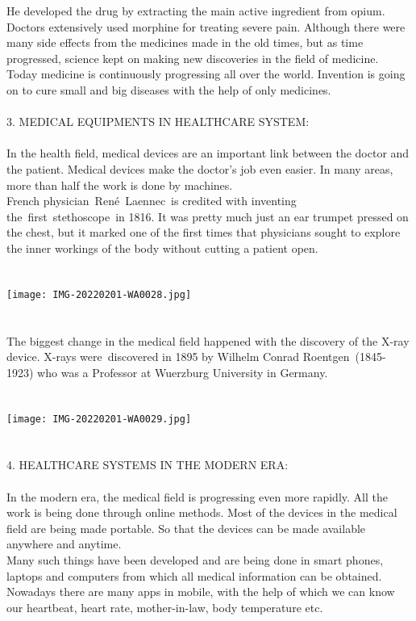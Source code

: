 \documentclass{article}
\begin{document}
He developed the drug by extracting the main active ingredient from opium. Doctors extensively used morphine for treating severe pain. Although there were many side effects from the medicines made in the old times, but as time progressed, science kept on making new discoveries in the field of medicine.  Today medicine is continuously progressing all over the world.  Invention is going on to cure small and big diseases with the help of only medicines.
\\
\\
3. MEDICAL EQUIPMENTS IN HEALTHCARE SYSTEM:\\
\\
      In the health field, medical devices are an important link between the doctor and the patient. Medical devices make the doctor's job even easier.  In many areas, more than half the work is done by machines.\\
French physician René Laennec is credited with inventing the first stethoscope in 1816. It was pretty much just an ear trumpet pressed on the chest, but it marked one of the first times that physicians sought to explore the inner workings of the body without cutting a patient open.\\ \\ \\
\texttt{[image: IMG-20220201-WA0028.jpg]}    \\ \\  \\       
The biggest change in the medical field happened with the discovery of the X-ray device. X-rays were discovered in 1895 by Wilhelm Conrad Roentgen (1845-1923) who was a Professor at Wuerzburg University in Germany.\\ \\ \\
\texttt{[image: IMG-20220201-WA0029.jpg]} 
\\ \\ \\
4. HEALTHCARE SYSTEMS IN THE MODERN ERA:\\ 
\\
In the modern era, the medical field is progressing even more rapidly.  All the work is being done through online methods.  Most of the devices in the medical field are being made portable.  So that the devices can be made available anywhere and anytime.\\
Many such things have been developed and are being done in smart phones, laptops and computers from which all medical information can be obtained.  Nowadays there are many apps in mobile, with the help of which we can know our heartbeat, heart rate, mother-in-law, body temperature etc.\\
\end{document}
